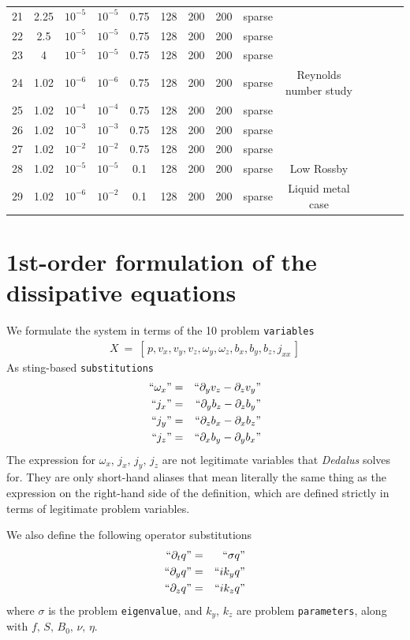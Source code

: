 \documentclass[aps,prl,preprint
,superscriptaddress]{revtex4-1}
\newcommand\Beq{\begin{eqnarray}}
\newcommand\Eeq{\end{eqnarray}}
\newcommand{\pd}[1]{\partial_{#1}}
\begin{document}
\begin{tabular}{cccccccccccccc}
21 & 2.25   & $10^{-5}$ & $10^{-5}$ & 0.75 & 128 & 200 & 200 & sparse & \\
22 & 2.5    & $10^{-5}$ & $10^{-5}$ & 0.75 & 128 & 200 & 200 & sparse & \\
23 & 4      & $10^{-5}$ & $10^{-5}$ & 0.75 & 128 & 200 & 200 & sparse & \\
24 & 1.02   & $10^{-6}$ & $10^{-6}$ & 0.75 & 128 & 200 & 200 & sparse & Reynolds number study\\
25 & 1.02   & $10^{-4}$ & $10^{-4}$ & 0.75 & 128 & 200 & 200 & sparse & \\
26 & 1.02   & $10^{-3}$ & $10^{-3}$ & 0.75 & 128 & 200 & 200 & sparse & \\
27 & 1.02   & $10^{-2}$ & $10^{-2}$ & 0.75 & 128 & 200 & 200 & sparse & \\
28 & 1.02   & $10^{-5}$ & $10^{-5}$ & 0.1  & 128 & 200 & 200 & sparse & Low Rossby\\ 
29 & 1.02   & $10^{-6}$ & $10^{-2}$ & 0.1  & 128 & 200 & 200 & sparse & Liquid metal case\\ 
\end{tabular}

\section{1st-order formulation of the dissipative equations}
\label{sec:formulation}

We formulate the system in terms of the 10 problem \texttt{variables} 
\Beq
X \ = \ \left[\,p,v_{x},v_{y},v_{z},\omega_{y},\omega_{z},b_{x},b_{y},b_{z},j_{xx}\,\right] \nonumber
\Eeq
As sting-based \texttt{substitutions} 
\Beq
``\omega_{x}" &=& ``\pd{y} v_{z} - \pd{z} v_{y}" \nonumber \\
``j_{x}" &=& ``\pd{y} b_{z} - \pd{z} b_{y}" \nonumber \\
``j_{y}" &=& ``\pd{z} b_{x} - \pd{x} b_{z}" \nonumber \\
``j_{z}" &=& ``\pd{x} b_{y} - \pd{y} b_{x}" \nonumber 
\Eeq
The expression for $\omega_{x},\,j_{x},\,j_{y},\,j_{z}$ are not legitimate variables that \textit{Dedalus} solves for. They are only short-hand aliases that mean literally the same thing as the expression on the right-hand side of the definition, which are defined strictly in terms of legitimate problem variables. 

We also define the following operator substitutions 
\Beq
``\pd{t} q" &=& ``\sigma q" \nonumber \\
``\pd{y} q" &=& ``i k_{y} q" \nonumber \\
``\pd{z} q" &=& ``i k_{z} q" \nonumber 
\Eeq
where $\sigma$ is the problem \texttt{eigenvalue}, and $k_{y},\,k_{z}$ are problem \texttt{parameters}, along with $f,\,S,\,B_{0},\, \nu,\, \eta$.
\end{document}
